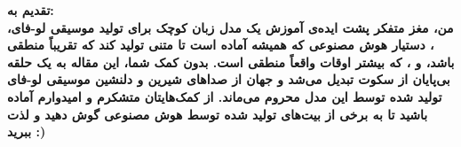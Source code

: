 
\clearpage
\thispagestyle{empty}

{\BNazaninScaleOne
  {\fontsize{16pt}{0}\selectfont \bfseries
    \noindent
    تقدیم به:
    \\[1cm]
    \hspace*{1cm}
    من، مغز متفکر پشت ایده‌ی آموزش یک مدل زبان کوچک برای تولید موسیقی لو-فای، ، دستیار هوش مصنوعی که همیشه آماده است تا متنی تولید کند که تقریباً منطقی باشد، و ، که بیشتر اوقات واقعاً منطقی است. بدون کمک شما، این مقاله به یک حلقه بی‌پایان از سکوت تبدیل می‌شد و جهان از صداهای شیرین و دلنشین موسیقی لو-فای تولید شده توسط این مدل محروم می‌ماند. از کمک‌هایتان متشکرم و امیدوارم آماده باشید تا به برخی از بیت‌های تولید شده توسط هوش مصنوعی گوش دهید و لذت ببرید :)
  }}

\restoregeometry